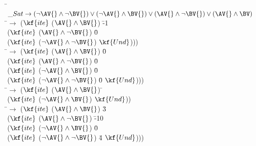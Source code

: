 \begin{subfigure}[t]{\textwidth}
  \begin{tabbing}
  \hquad \= $\_Sat \rightarrow (\neg \AV{} \wedge \neg \BV{}) \vee (\neg \AV{} \wedge \BV{}) \vee (\AV{} \wedge \neg \BV{}) \vee (\AV{} \wedge \BV)$ \\
  \> \iV{}\quad\hspace{1.7ex}\=$\rightarrow$ ($\kf{ite}$ ($\AV{} \wedge \BV{}$)\; \=-1 \\
  \> \> \> ($\kf{ite}$\; ($\AV{} \wedge \neg \BV{}$)\; \=0 \\
  \> \> \> \> ($\kf{ite}$\; ($\neg \AV{} \wedge \neg \BV{}$) $\kf{Und}$))) \\

  \> \cV{}\quad\hspace{1.7ex}\=$\rightarrow$ ($\kf{ite}$ ($\AV{} \wedge \BV{}$)\; \=0 \\
  \> \> \> ($\kf{ite}$\; ($\AV{} \wedge \neg \BV{}$)\; \=0 \\
  \> \> \> \> ($\kf{ite}$\; ($\neg \AV{} \wedge \BV{}$)\; \=0  \\
  \> \> \> \> \> ($\kf{ite}$\; ($\neg \AV{} \wedge \neg \BV{}$)\; \=0 $\kf{Und}$))) \\

  \> \aV{}\quad\hspace{1.7ex}\=$\rightarrow$ ($\kf{ite}$ ($ \AV{} \wedge \BV{}$)\; \=\tru{} \\
  \> \> \> ($\kf{ite}$ ($\neg \AV{} \wedge \BV{}$) \fls{} $\kf{Und}$))\\


  \> \bV{}\quad\hspace{1.7ex}\=$\rightarrow$ ($\kf{ite}$ ($\AV{} \wedge \BV{}$)\; \=3 \\
  \> \> \> ($\kf{ite}$\; ($\AV{} \wedge \neg \BV{}$)\; \=-10 \\
  \> \> \> \> ($\kf{ite}$\; ($\neg \AV{} \wedge \BV{}$)\; \=0  \\
  \> \> \> \> \> ($\kf{ite}$\; ($\neg \AV{} \wedge \neg \BV{}$)\; \=4 $\kf{Und}$))) \\
\end{tabbing}
\end{subfigure}
